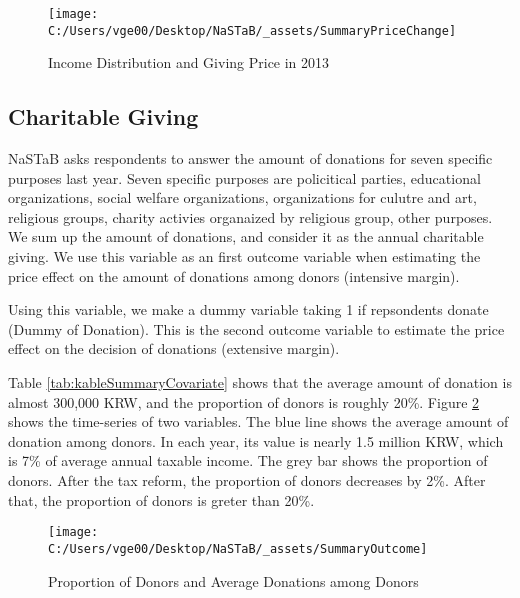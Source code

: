 \documentclass[ review  , 3p ]{elsarticle}
\begin{document}
  \begin{figure}[t]

  {\centering \texttt{[image: C:/Users/vge00/Desktop/NaSTaB/\_assets/SummaryPriceChange]} 

  }

  \caption{Income Distribution and Giving Price in 2013}\label{fig:showSummaryPriceChange}
  \end{figure}

  \hypertarget{charitable-giving}{%
  \subsection{Charitable Giving}\label{charitable-giving}}

  NaSTaB asks respondents to answer the amount of donations for seven specific purposes last year.
  Seven specific purposes are
  policitical parties,
  educational organizations,
  social welfare organizations,
  organizations for culutre and art,
  religious groups,
  charity activies organaized by religious group,
  other purposes.
  We sum up the amount of donations, and consider it as the annual charitable giving.
  We use this variable as an first outcome variable when
  estimating the price effect on the amount of donations among donors (intensive margin).

  Using this variable, we make a dummy variable taking 1 if repsondents donate (Dummy of Donation).
  This is the second outcome variable
  to estimate the price effect on the decision of donations (extensive margin).

  Table \ref{tab:kableSummaryCovariate} shows that
  the average amount of donation is almost 300,000 KRW,
  and the proportion of donors is roughly 20\%.
  Figure \ref{fig:showDonationRate} shows the time-series of two variables.
  The blue line shows the average amount of donation among donors.
  In each year, its value is nearly 1.5 million KRW,
  which is 7\% of average annual taxable income.
  The grey bar shows the proportion of donors.
  After the tax reform, the proportion of donors decreases by 2\%.
  After that, the proportion of donors is greter than 20\%.
  \color{black}

  \begin{figure}[t]

  {\centering \texttt{[image: C:/Users/vge00/Desktop/NaSTaB/\_assets/SummaryOutcome]} 

  }

  \caption{Proportion of Donors and Average Donations among Donors}\label{fig:showDonationRate}
  \end{figure}
\end{document}
